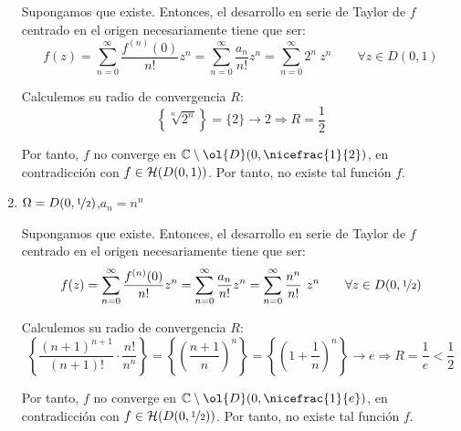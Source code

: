 \begin{ejercicio}
\begin{enumerate}
        Supongamos que existe. Entonces, el desarrollo en serie de Taylor de $f$ centrado en el origen necesariamente tiene que ser:
        \begin{equation*}
            f(z) = \sum_{n=0}^{\infty} \dfrac{f^{(n)}(0)}{n!}z^n = \sum_{n=0}^{\infty} \dfrac{a_n}{n!}z^n = \sum_{n=0}^{\infty} 2^n\ z^n\qquad 
            \forall z \in D(0,1)
        \end{equation*}

        Calculemos su radio de convergencia $R$:
        \begin{equation*}
            \left\{\sqrt[n]{2^n}\right\}=\{2\}\to 2\Longrightarrow R=\frac{1}{2}
        \end{equation*}

        Por tanto, $f$ no converge en $\bb{C}\setminus \ol{D}(0,\nicefrac{1}{2})$, en contradicción con $f\in \mathcal{H}(D(0,1))$. Por tanto, no existe tal función $f$.
        \item $\Omega = D(0,\nicefrac{1}{2})$,\qquad $a_n = n^n$
        
        Supongamos que existe. Entonces, el desarrollo en serie de Taylor de $f$ centrado en el origen necesariamente tiene que ser:
        \begin{equation*}
            f(z) = \sum_{n=0}^{\infty} \dfrac{f^{(n)}(0)}{n!}z^n = \sum_{n=0}^{\infty} \dfrac{a_n}{n!}z^n = \sum_{n=0}^{\infty} \dfrac{n^n}{n!}\ z^n\qquad
            \forall z \in D(0,\nicefrac{1}{2})
        \end{equation*}

        Calculemos su radio de convergencia $R$:
        \begin{equation*}
            \left\{\dfrac{(n+1)^{n+1}}{(n+1)!}\cdot \dfrac{n!}{n^n}\right\}=\left\{\left(\dfrac{n+1}{n}\right)^{n}\right\}=\left\{\left(1+\dfrac{1}{n}\right)^{n}\right\} \to e\Longrightarrow R=\frac{1}{e}<\frac{1}{2}
        \end{equation*}

        Por tanto, $f$ no converge en $\bb{C}\setminus \ol{D}(0,\nicefrac{1}{e})$, en contradicción con $f\in \mathcal{H}(D(0,\nicefrac{1}{2}))$. Por tanto, no existe tal función $f$.
    \end{enumerate}
\end{ejercicio}

